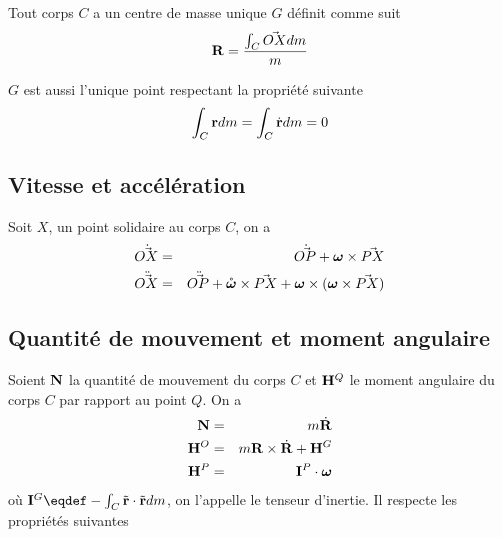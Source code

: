 Tout corps $C$ a un centre de masse unique $G$ définit comme suit
\[ {\bf R} = \frac{\int_C \vec{OX} dm}{m} \]

$G$ est aussi l'unique point respectant la propriété suivante
\[ \int_C {\bf r} dm = \int_C \dot{\bf r} dm = 0 \]

\subsection{Vitesse et accélération}
Soit $X$, un point solidaire au corps $C$, on a
\begin{eqnarray*}
	\dot{\vec{ OX}} &=& \dot{\vec{ OP}} + {\bm \omega} \times \vec{PX}\\
	\ddot{\vec{ OX}} &=& \ddot{\vec{ OP}} + \mathring{\bm \omega} \times \vec{PX} + {\bm \omega} \times ({\bm \omega} \times \vec{PX})
\end{eqnarray*}

\subsection{Quantité de mouvement et moment angulaire}
Soient ${\bf N}$ la quantité de mouvement du corps $C$ et ${\bf H}^Q$ le moment angulaire du corps $C$ par rapport au point $Q$.
On a
\begin{eqnarray*}
	{\bf N} &=& m \dot{\bf R}\\
	{\bf H}^O &=& m {\bf R} \times \dot{\bf R} + {\bf H}^G\\
	{\bf H}^P &=& {\bf I}^P \cdot {\bm \omega}
\end{eqnarray*}
où $\ine^G \eqdef -\int_C \tilde{\fv{r}}\cdot\tilde{\fv{r}} dm$, on l'appelle le tenseur d'inertie.
Il respecte les propriétés suivantes

